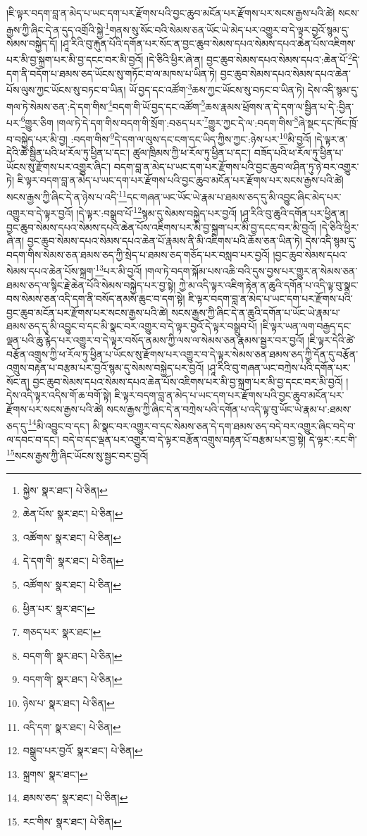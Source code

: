 །ཇི་ལྟར་བདག་བླ་ན་མེད་པ་ཡང་དག་པར་རྫོགས་པའི་བྱང་ཆུབ་མངོན་པར་རྫོགས་པར་སངས་རྒྱས་པའི་ཚེ། སངས་རྒྱས་ཀྱི་ཞིང་དེ་ན་དུད་འགྲོའི་སྐྱེ་\footnote{སྐྱེས་  སྣར་ཐང་།  པེ་ཅིན། }གནས་སུ་སོང་བའི་སེམས་ཅན་ཡོང་ཡེ་མེད་པར་འགྱུར་བ་དེ་ལྟར་བྱའོ་སྙམ་དུ་སེམས་བསྐྱེད་དོ། །ཤཱ་རིའི་བུ་རྐུན་པོའི་དགོན་པར་སོང་ན་བྱང་ཆུབ་སེམས་དཔའ་སེམས་དཔའ་ཆེན་པོས་འཇིགས་པར་མི་བྱ་སྐྲག་པར་མི་བྱ་དངང་བར་མི་བྱའོ། །དེ་ཅིའི་ཕྱིར་ཞེ་ན། བྱང་ཆུབ་སེམས་དཔའ་སེམས་དཔའ་:ཆེན་པོ་\footnote{ཆེན་པོས་  སྣར་ཐང་།  པེ་ཅིན། }དེ་དག་ནི་བདོག་པ་ཐམས་ཅད་ཡོངས་སུ་གཏོང་བ་ལ་མཁས་པ་ཡིན་ཏེ། བྱང་ཆུབ་སེམས་དཔའ་སེམས་དཔའ་ཆེན་པོས་ལུས་ཀྱང་ཡོངས་སུ་བཏང་བ་ཡིན། ཡོ་བྱད་དང་འཚོག་\footnote{འཚོགས་  སྣར་ཐང་།  པེ་ཅིན། }ཆས་ཀྱང་ཡོངས་སུ་བཏང་བ་ཡིན་ཏེ། དེས་འདི་སྙམ་དུ་གལ་ཏེ་སེམས་ཅན་:དེ་དག་གིས་\footnote{དེ་དག་གི་  སྣར་ཐང་།  པེ་ཅིན། }བདག་གི་ཡོ་བྱད་དང་འཚོག་\footnote{འཚོགས་  སྣར་ཐང་།  པེ་ཅིན། }ཆས་རྣམས་ཕྲོགས་ན་དེ་དག་ལ་སྦྱིན་པ་དེ་:བྱིན་པར་\footnote{ཕྱིན་པར་  སྣར་ཐང་། }གྱུར་ཅིག །གལ་ཏེ་དེ་དག་གིས་བདག་གི་སྲོག་:བཅད་པར་\footnote{གཅད་པར་  སྣར་ཐང་། }གྱུར་ཀྱང་དེ་ལ་:བདག་གིས་\footnote{བདག་གི་  སྣར་ཐང་།  པེ་ཅིན། }ཞེ་སྡང་དང་ཁོང་ཁྲོ་བ་བསྐྱེད་པར་མི་བྱ། :བདག་གིས་\footnote{བདག་གི་  སྣར་ཐང་།  པེ་ཅིན། }དེ་དག་ལ་ལུས་དང་ངག་དང་ཡིད་ཀྱིས་ཀྱང་:ཉེས་པར་\footnote{ཉེས་པ་  སྣར་ཐང་།  པེ་ཅིན། }མི་བྱའོ། །དེ་ལྟར་ན་དེའི་ཚེ་སྦྱིན་པའི་ཕ་རོལ་ཏུ་ཕྱིན་པ་དང་། ཚུལ་ཁྲིམས་ཀྱི་ཕ་རོལ་ཏུ་ཕྱིན་པ་དང་། བཟོད་པའི་ཕ་རོལ་ཏུ་ཕྱིན་པ་ཡོངས་སུ་རྫོགས་པར་འགྱུར་ཞིང་། བདག་བླ་ན་མེད་པ་ཡང་དག་པར་རྫོགས་པའི་བྱང་ཆུབ་ལ་ཤིན་ཏུ་ཉེ་བར་འགྱུར་ཏེ། ཇི་ལྟར་བདག་བླ་ན་མེད་པ་ཡང་དག་པར་རྫོགས་པའི་བྱང་ཆུབ་མངོན་པར་རྫོགས་པར་སངས་རྒྱས་པའི་ཚེ། སངས་རྒྱས་ཀྱི་ཞིང་དེ་ན་ཉེས་པ་འདི་\footnote{འདི་དག་  སྣར་ཐང་།  པེ་ཅིན། }དང་གཞན་ཡང་ཡོང་ཡེ་རྣམ་པ་ཐམས་ཅད་དུ་མི་འབྱུང་ཞིང་མེད་པར་འགྱུར་བ་དེ་ལྟར་བྱའོ། །དེ་ལྟར་:བསྒྲུབ་པོ་\footnote{བསྒྲུབ་པར་བྱའོ་  སྣར་ཐང་།  པེ་ཅིན། }སྙམ་དུ་སེམས་བསྐྱེད་པར་བྱའོ། །ཤཱ་རིའི་བུ་ཆུའི་དགོན་པར་ཕྱིན་ན། བྱང་ཆུབ་སེམས་དཔའ་སེམས་དཔའ་ཆེན་པོས་འཇིགས་པར་མི་བྱ་སྐྲག་པར་མི་བྱ་དངང་བར་མི་བྱའོ། །དེ་ཅིའི་ཕྱིར་ཞེ་ན། བྱང་ཆུབ་སེམས་དཔའ་སེམས་དཔའ་ཆེན་པོ་རྣམས་ནི་མི་འཇིགས་པའི་ཆོས་ཅན་ཡིན་ཏེ། དེས་འདི་སྙམ་དུ་བདག་གིས་སེམས་ཅན་ཐམས་ཅད་ཀྱི་སྲེད་པ་ཐམས་ཅད་གཅོད་པར་བསླབ་པར་བྱའོ། །བྱང་ཆུབ་སེམས་དཔའ་སེམས་དཔའ་ཆེན་པོས་སྐྲག་\footnote{སྐྲགས་  སྣར་ཐང་། }པར་མི་བྱའོ། །གལ་ཏེ་བདག་སྐོམ་པས་འཆི་བའི་དུས་བྱས་པར་གྱུར་ན་སེམས་ཅན་ཐམས་ཅད་ལ་སྙིང་རྗེ་ཆེན་པོའི་སེམས་བསྐྱེད་པར་བྱ་སྟེ། ཀྱེ་མ་འདི་ལྟར་འཇིག་རྟེན་ན་ཆུའི་དགོན་པ་འདི་ལྟ་བུ་སྣང་བས་སེམས་ཅན་འདི་དག་ནི་བསོད་ནམས་ཆུང་བ་དག་སྟེ། ཇི་ལྟར་བདག་བླ་ན་མེད་པ་ཡང་དག་པར་རྫོགས་པའི་བྱང་ཆུབ་མངོན་པར་རྫོགས་པར་སངས་རྒྱས་པའི་ཚེ། སངས་རྒྱས་ཀྱི་ཞིང་དེ་ན་ཆུའི་དགོན་པ་ཡོང་ཡེ་རྣམ་པ་ཐམས་ཅད་དུ་མི་འབྱུང་བ་དང་མི་སྣང་བར་འགྱུར་བ་དེ་ལྟར་བྱའོ་དེ་ལྟར་བསྒྲུབ་པོ། །ཇི་ལྟར་ཡན་ལག་བརྒྱད་དང་ལྡན་པའི་ཆུ་རྙེད་པར་འགྱུར་བ་དེ་ལྟར་བསོད་ནམས་ཀྱི་ལས་ལ་སེམས་ཅན་རྣམས་སྦྱར་བར་བྱའོ། །ཇི་ལྟར་དེའི་ཚེ་བརྩོན་འགྲུས་ཀྱི་ཕ་རོལ་ཏུ་ཕྱིན་པ་ཡོངས་སུ་རྫོགས་པར་འགྱུར་བ་དེ་ལྟར་སེམས་ཅན་ཐམས་ཅད་ཀྱི་དོན་དུ་བརྩོན་འགྲུས་བརྟན་པ་བརྩམ་པར་བྱའོ་སྙམ་དུ་སེམས་བསྐྱེད་པར་བྱའོ། །ཤཱ་རིའི་བུ་གཞན་ཡང་བཀྲེས་པའི་དགོན་པར་སོང་ན། བྱང་ཆུབ་སེམས་དཔའ་སེམས་དཔའ་ཆེན་པོས་འཇིགས་པར་མི་བྱ་སྐྲག་པར་མི་བྱ་དངང་བར་མི་བྱའོ། །དེས་འདི་ལྟར་འདིས་གོ་ཆ་བགོ་སྟེ། ཇི་ལྟར་བདག་བླ་ན་མེད་པ་ཡང་དག་པར་རྫོགས་པའི་བྱང་ཆུབ་མངོན་པར་རྫོགས་པར་སངས་རྒྱས་པའི་ཚེ། སངས་རྒྱས་ཀྱི་ཞིང་དེ་ན་བཀྲེས་པའི་དགོན་པ་འདི་ལྟ་བུ་ཡོང་ཡེ་རྣམ་པ་:ཐམས་ཅད་དུ་\footnote{ཐམས་ཅད་  སྣར་ཐང་།  པེ་ཅིན། }མི་འབྱུང་བ་དང་། མི་སྣང་བར་འགྱུར་བ་དང་སེམས་ཅན་དེ་དག་ཐམས་ཅད་བདེ་བར་འགྱུར་ཞིང་བདེ་བ་ལ་དབང་བ་དང་། བདེ་བ་དང་ལྡན་པར་འགྱུར་བ་དེ་ལྟར་བརྩོན་འགྲུས་བརྟན་པོ་བརྩམ་པར་བྱ་སྟེ། དེ་ལྟར་:རང་གི་\footnote{རང་གིས་  སྣར་ཐང་།  པེ་ཅིན། }སངས་རྒྱས་ཀྱི་ཞིང་ཡོངས་སུ་སྦྱང་བར་བྱའོ། 